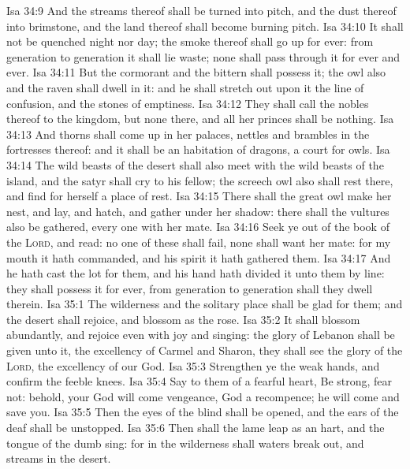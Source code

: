 \vs Isa 34:9 And the streams thereof shall be turned into pitch, and the dust thereof into brimstone, and the land thereof shall become burning pitch.
\vs Isa 34:10 It shall not be quenched night nor day; the smoke thereof shall go up for ever: from generation to generation it shall lie waste; none shall pass through it for ever and ever.
\vs Isa 34:11 But the cormorant and the bittern shall possess it; the owl also and the raven shall dwell in it: and he shall stretch out upon it the line of confusion, and the stones of emptiness.
\vs Isa 34:12 They shall call the nobles thereof to the kingdom, but none  there, and all her princes shall be nothing.
\vs Isa 34:13 And thorns shall come up in her palaces, nettles and brambles in the fortresses thereof: and it shall be an habitation of dragons,  a court for owls.
\vs Isa 34:14 The wild beasts of the desert shall also meet with the wild beasts of the island, and the satyr shall cry to his fellow; the screech owl also shall rest there, and find for herself a place of rest.
\vs Isa 34:15 There shall the great owl make her nest, and lay, and hatch, and gather under her shadow: there shall the vultures also be gathered, every one with her mate.
\vs Isa 34:16 Seek ye out of the book of the \textsc{Lord}, and read: no one of these shall fail, none shall want her mate: for my mouth it hath commanded, and his spirit it hath gathered them.
\vs Isa 34:17 And he hath cast the lot for them, and his hand hath divided it unto them by line: they shall possess it for ever, from generation to generation shall they dwell therein.
\vs Isa 35:1 The wilderness and the solitary place shall be glad for them; and the desert shall rejoice, and blossom as the rose.
\vs Isa 35:2 It shall blossom abundantly, and rejoice even with joy and singing: the glory of Lebanon shall be given unto it, the excellency of Carmel and Sharon, they shall see the glory of the \textsc{Lord},  the excellency of our God.
\vs Isa 35:3 Strengthen ye the weak hands, and confirm the feeble knees.
\vs Isa 35:4 Say to them  of a fearful heart, Be strong, fear not: behold, your God will come  vengeance,  God  a recompence; he will come and save you.
\vs Isa 35:5 Then the eyes of the blind shall be opened, and the ears of the deaf shall be unstopped.
\vs Isa 35:6 Then shall the lame  leap as an hart, and the tongue of the dumb sing: for in the wilderness shall waters break out, and streams in the desert.
